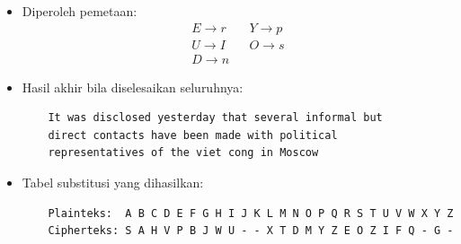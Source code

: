 \documentclass{article}
\begin{document}

\begin{itemize}
    \item Diperoleh pemetaan:
    \[ 
    \begin{aligned}
    E \rightarrow r && Y \rightarrow p \\
    U \rightarrow I && O \rightarrow s \\
    D \rightarrow n && 
    \end{aligned}
    \]
    \vspace{5mm}
    \item Hasil akhir bila diselesaikan seluruhnya:
    \begin{verbatim}
    It was disclosed yesterday that several informal but
    direct contacts have been made with political
    representatives of the viet cong in Moscow
    \end{verbatim}
    \vspace{5mm}
    \item Tabel substitusi yang dihasilkan:
    \begin{verbatim}
    Plainteks:  A B C D E F G H I J K L M N O P Q R S T U V W X Y Z
    Cipherteks: S A H V P B J W U - - X T D M Y Z E O Z I F Q - G -
    \end{verbatim}
\end{itemize}
\end{document}
